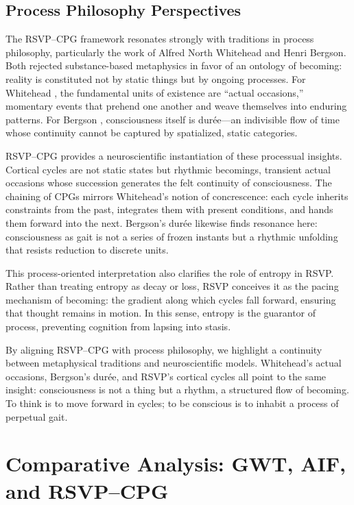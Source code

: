 \documentclass{article}
\begin{document}
\subsection{Process Philosophy Perspectives}

The RSVP--CPG framework resonates strongly with traditions in process philosophy, particularly the work of Alfred North Whitehead and Henri Bergson. Both rejected substance-based metaphysics in favor of an ontology of becoming: reality is constituted not by static things but by ongoing processes. For Whitehead \citep{whitehead1929process}, the fundamental units of existence are “actual occasions,” momentary events that prehend one another and weave themselves into enduring patterns. For Bergson \citep{bergson1910time}, consciousness itself is durée—an indivisible flow of time whose continuity cannot be captured by spatialized, static categories.

RSVP--CPG provides a neuroscientific instantiation of these processual insights. Cortical cycles are not static states but rhythmic becomings, transient actual occasions whose succession generates the felt continuity of consciousness. The chaining of CPGs mirrors Whitehead’s notion of concrescence: each cycle inherits constraints from the past, integrates them with present conditions, and hands them forward into the next. Bergson’s durée likewise finds resonance here: consciousness as gait is not a series of frozen instants but a rhythmic unfolding that resists reduction to discrete units.

This process-oriented interpretation also clarifies the role of entropy in RSVP. Rather than treating entropy as decay or loss, RSVP conceives it as the pacing mechanism of becoming: the gradient along which cycles fall forward, ensuring that thought remains in motion. In this sense, entropy is the guarantor of process, preventing cognition from lapsing into stasis.

By aligning RSVP--CPG with process philosophy, we highlight a continuity between metaphysical traditions and neuroscientific models. Whitehead’s actual occasions, Bergson’s durée, and RSVP’s cortical cycles all point to the same insight: consciousness is not a thing but a rhythm, a structured flow of becoming. To think is to move forward in cycles; to be conscious is to inhabit a process of perpetual gait.


\section{Comparative Analysis: GWT, AIF, and RSVP--CPG}
\end{document}
